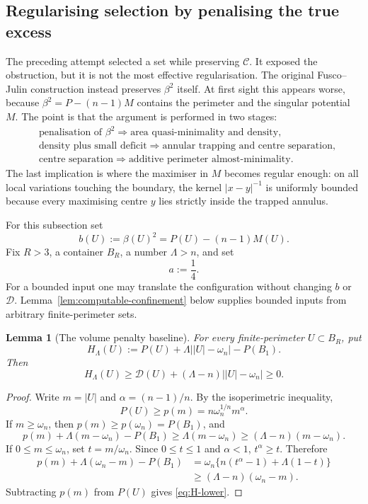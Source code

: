 \documentclass[11pt]{amsart}
\newtheorem{lemma}[theorem]{Lemma}
\theoremstyle{definition}
\newcommand{\Per}{P}
\newcommand{\Def}{\mathcal D}
\begin{document}
\subsection{Regularising selection by penalising the true excess}
\label{ssec:true-beta-selection}

The preceding attempt selected a set while preserving
\(\mathcal C\).  It exposed the obstruction, but it is not the most effective
regularisation.  The original Fusco--Julin construction \cite{FJ} instead
preserves \(\beta^2\) itself.  At first sight this appears worse, because
\(\beta^2=\Per-(n-1)M\) contains the perimeter and the singular potential
\(M\).  The point is that the argument is performed in two stages:
\[
\begin{split}
   &\text{penalisation of \(\beta^2\)}
   \Longrightarrow \text{area quasi-minimality and density},\\
   &\text{density plus small deficit}
   \Longrightarrow \text{annular trapping and centre separation},\\
   &\text{centre separation}
   \Longrightarrow \text{additive perimeter almost-minimality}.
\end{split}
\tag{4.49}\label{eq:regularising-chain}
\]
The last implication is where the maximiser in \(M\) becomes regular enough:
on all local variations touching the boundary, the kernel
\(|x-y|^{-1}\) is uniformly bounded because every maximising centre \(y\)
lies strictly inside the trapped annulus.

For this subsection set
\[
   b(U):=\beta(U)^2=\Per(U)-(n-1)M(U).
\tag{4.50}\label{eq:bU}
\]
Fix \(R>3\), a container \(B_R\), a number \(\Lambda>n\), and set
\[
   a:=\frac14.
\tag{4.51}\label{eq:a-quarter}
\]
For a bounded input one may translate the configuration without changing
\(b\) or \(\Def\).  Lemma~\ref{lem:computable-confinement} below supplies
bounded inputs from arbitrary finite-perimeter sets.

\begin{lemma}[The volume penalty baseline]\label{lem:volume-baseline}
For every finite-perimeter \(U\subset B_R\), put
\[
   H_\Lambda(U):=
   \Per(U)+\Lambda\bigl||U|-\omega_n\bigr|-\Per(B_1).
\tag{4.52}\label{eq:H-Lambda}
\]
Then
\[
   H_\Lambda(U)
   \ge \Def(U)+(\Lambda-n)\bigl||U|-\omega_n\bigr|
   \ge0.
\tag{4.53}\label{eq:H-lower}
\]
\end{lemma}

\begin{proof}
Write \(m=|U|\) and \(\alpha=(n-1)/n\).  By the isoperimetric inequality,
\[
   \Per(U)\ge p(m)=n\omega_n^{1/n}m^\alpha.
\]
If \(m\ge\omega_n\), then \(p(m)\ge p(\omega_n)=\Per(B_1)\), and
\[
   p(m)+\Lambda(m-\omega_n)-\Per(B_1)
   \ge\Lambda(m-\omega_n)
   \ge(\Lambda-n)(m-\omega_n).
\]
If \(0\le m\le\omega_n\), set \(t=m/\omega_n\).  Since
\(0\le t\le1\) and \(\alpha<1\), \(t^\alpha\ge t\).  Therefore
\[
\begin{aligned}
   p(m)+\Lambda(\omega_n-m)-\Per(B_1)
   &=\omega_n\{n(t^\alpha-1)+\Lambda(1-t)\}\\
   &\ge(\Lambda-n)(\omega_n-m).
\end{aligned}
\]
Subtracting \(p(m)\) from \(\Per(U)\) gives \eqref{eq:H-lower}.
\end{proof}
\end{document}
